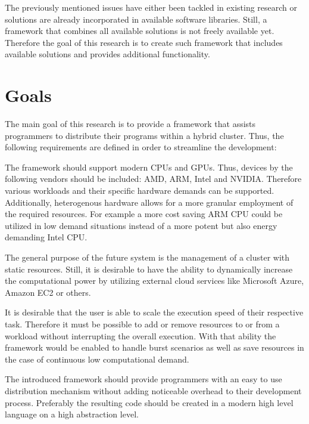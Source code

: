 The previously mentioned issues have either been tackled in existing research or solutions are already incorporated in available software libraries. Still, a framework that combines all available solutions is not freely available yet. Therefore the goal of this research is to create such framework that includes available solutions and provides additional functionality.

\section{Goals}
\label{goals}
The main goal of this research is to provide a framework that assists programmers to distribute their programs within a hybrid cluster. Thus, the following requirements are defined in order to streamline the development:

\begin{description}[style=nextline]
    \item [Heterogeneity]
    The framework should support modern CPUs and GPUs. Thus, devices by the following vendors should be included: AMD, ARM, Intel and NVIDIA. Therefore various workloads and their specific hardware demands can be supported. Additionally, heterogenous hardware allows for a more granular employment of the required resources. For example a more cost saving ARM CPU could be utilized in low demand situations instead of a more potent but also energy demanding Intel CPU.

    \item [Resource Scalability]
    The general purpose of the future system is the management of a cluster with static resources. Still, it is desirable to have the ability to dynamically increase the computational power by utilizing external cloud services like Microsoft Azure, Amazon EC2 or others.

    \item [Scalable Speed]
    It is desirable that the user is able to scale the execution speed of their respective task. Therefore it must be possible to add or remove resources to or from a workload without interrupting the overall execution. With that ability the framework would be enabled to handle burst scenarios as well as save resources in the case of continuous low computational demand.

    \item [Ease of Programming]
    The introduced framework should provide programmers with an easy to use distribution mechanism without adding noticeable overhead to their development process. Preferably the resulting code should be created in a modern high level language on a high abstraction level.


\end{description}
